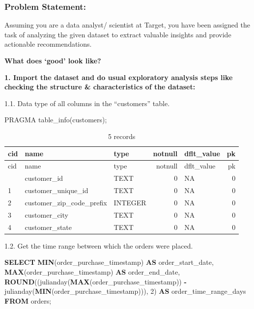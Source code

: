 \documentclass[
]{article}
\newenvironment{Shaded}{\begin{snugshade}}{\end{snugshade}}
\newcommand{\DecValTok}[1]{\textcolor[rgb]{0.00,0.00,0.81}{#1}}
\newcommand{\FunctionTok}[1]{\textcolor[rgb]{0.13,0.29,0.53}{\textbf{#1}}}
\newcommand{\KeywordTok}[1]{\textcolor[rgb]{0.13,0.29,0.53}{\textbf{#1}}}
\newcommand{\NormalTok}[1]{#1}
\newcommand{\OperatorTok}[1]{\textcolor[rgb]{0.81,0.36,0.00}{\textbf{#1}}}
\begin{document}
\subsubsection{Problem Statement:}\label{problem-statement}

Assuming you are a data analyst/ scientist at Target, you have been
assigned the task of analyzing the given dataset to extract valuable
insights and provide actionable recommendations.

\textbf{What does `good' look like?}

\textbf{1. Import the dataset and do usual exploratory analysis steps
like checking the structure \& characteristics of the dataset:}

1.1. Data type of all columns in the ``customers'' table.

\begin{Shaded}
\begin{Highlighting}[]
\NormalTok{PRAGMA table\_info(customers);}
\end{Highlighting}
\end{Shaded}

\begin{longtable}[]{@{}lllrlr@{}}
\caption{5 records}\tabularnewline
\toprule\noalign{}
cid & name & type & notnull & dflt\_value & pk \\
\midrule\noalign{}
\endfirsthead
\toprule\noalign{}
cid & name & type & notnull & dflt\_value & pk \\
\midrule\noalign{}
\endhead
\bottomrule\noalign{}
\endlastfoot
0 & customer\_id & TEXT & 0 & NA & 0 \\
1 & customer\_unique\_id & TEXT & 0 & NA & 0 \\
2 & customer\_zip\_code\_prefix & INTEGER & 0 & NA & 0 \\
3 & customer\_city & TEXT & 0 & NA & 0 \\
4 & customer\_state & TEXT & 0 & NA & 0 \\
\end{longtable}

1.2. Get the time range between which the orders were placed.

\begin{Shaded}
\begin{Highlighting}[]
\KeywordTok{SELECT} 
    \FunctionTok{MIN}\NormalTok{(order\_purchase\_timestamp) }\KeywordTok{AS}\NormalTok{ order\_start\_date, }
    \FunctionTok{MAX}\NormalTok{(order\_purchase\_timestamp) }\KeywordTok{AS}\NormalTok{ order\_end\_date,}
    \FunctionTok{ROUND}\NormalTok{((julianday(}\FunctionTok{MAX}\NormalTok{(order\_purchase\_timestamp)) }\OperatorTok{{-}} 
\NormalTok{      julianday(}\FunctionTok{MIN}\NormalTok{(order\_purchase\_timestamp))), }\DecValTok{2}\NormalTok{) }\KeywordTok{AS}\NormalTok{ order\_time\_range\_days}
\KeywordTok{FROM} 
\NormalTok{    orders;}
\end{Highlighting}
\end{Shaded}
\end{document}
